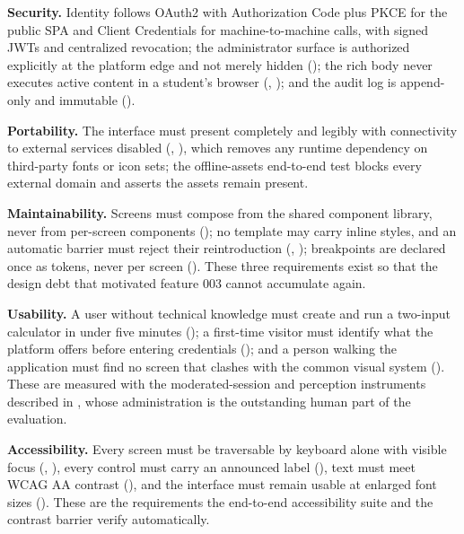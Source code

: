 \textbf{Security.} Identity follows OAuth2 with Authorization Code plus PKCE for the public SPA and
Client Credentials for machine-to-machine calls, with signed JWTs and centralized revocation; the
administrator surface is authorized explicitly at the platform edge and not merely hidden
(); the rich body never executes active content in a student's browser (,
); and the audit log is append-only and immutable ().

\textbf{Portability.} The interface must present completely and legibly with connectivity to
external services disabled (, ), which removes any runtime dependency on
third-party fonts or icon sets; the offline-assets end-to-end test blocks every external domain and
asserts the assets remain present.

\textbf{Maintainability.} Screens must compose from the shared component library, never from
per-screen components (); no template may carry inline styles, and an automatic
barrier must reject their reintroduction (, ); breakpoints are declared
once as tokens, never per screen (). These three requirements exist so that the design
debt that motivated feature 003 cannot accumulate again.

\textbf{Usability.} A user without technical knowledge must create and run a two-input calculator in
under five minutes (); a first-time visitor must identify what the platform offers
before entering credentials (); and a person walking the application must find no
screen that clashes with the common visual system (). These are measured with the
moderated-session and perception instruments described in
, whose administration is the outstanding human
part of the evaluation.

\textbf{Accessibility.} Every screen must be traversable by keyboard alone with visible focus
(, ), every control must carry an announced label (), text
must meet WCAG AA contrast (), and the interface must remain usable at enlarged font
sizes (). These are the requirements the end-to-end accessibility suite and the
contrast barrier verify automatically.

